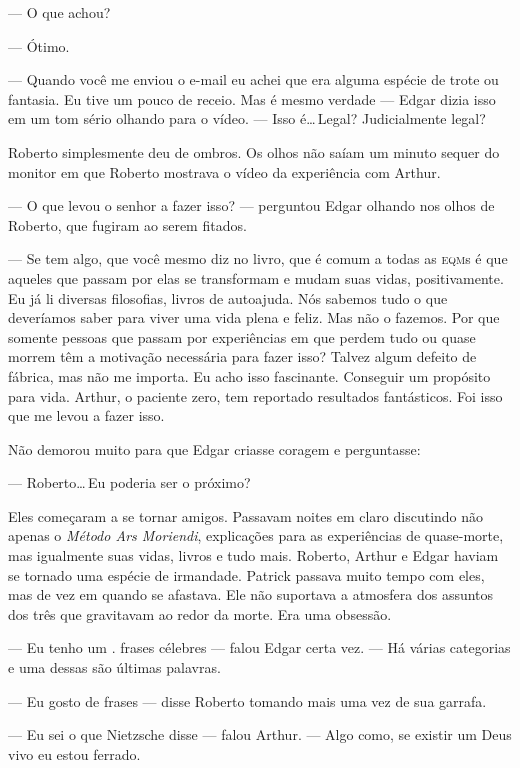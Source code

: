 --- O que achou?

--- Ótimo.

--- Quando você me enviou o e-mail eu achei que era alguma espécie de trote ou fantasia. Eu tive um pouco de receio. Mas é mesmo verdade --- Edgar dizia isso em um tom sério olhando para o vídeo. --- Isso é\ldots\,Legal? Judicialmente legal?

Roberto simplesmente deu de ombros. Os olhos não saíam um minuto sequer do monitor em que Roberto mostrava o vídeo da experiência com Arthur.

--- O que levou o senhor a fazer isso? --- perguntou Edgar olhando nos olhos de Roberto, que fugiram ao serem fitados.

--- Se tem algo, que você mesmo diz no livro, que é comum a todas as \textsc{eqm}s\mudanca{,} é que aqueles que passam por elas se transformam e mudam suas vidas, positivamente. Eu já li diversas filosofias, livros de autoajuda. Nós sabemos tudo o que deveríamos saber para viver uma vida plena e feliz. Mas não o fazemos. Por que somente pessoas que passam por experiências em que perdem tudo ou quase morrem têm a motivação necessária para fazer isso? Talvez algum defeito de fábrica, mas não me importa. Eu acho isso fascinante. Conseguir um propósito para vida. Arthur, o paciente zero, tem reportado resultados fantásticos. Foi isso que me levou a fazer isso.

Não demorou muito para que Edgar criasse coragem e perguntasse:

--- Roberto\ldots\,Eu poderia ser o próximo?

Eles começaram a se tornar amigos. Passavam noites em claro discutindo não apenas o \emph{Método Ars Moriendi}, explicações para as experiências de quase-morte, mas igualmente suas vidas, livros e tudo mais. Roberto, Arthur e Edgar haviam se tornado uma espécie de irmandade. Patrick passava muito tem\-po com eles, mas de vez em quando se afastava. Ele não suportava a atmosfera dos assuntos dos três que gravitavam ao redor da morte. Era uma obsessão.

--- Eu tenho um .  frases célebres --- falou Edgar\mudanca{,} certa vez. --- Há várias categorias\mudanca{,} e uma dessas são últimas palavras.

--- Eu gosto de frases --- disse Roberto tomando mais uma vez de sua garrafa.

--- Eu sei o que Nietzsche disse --- falou Arthur. --- Algo como, se existir um Deus vivo eu estou ferrado.

